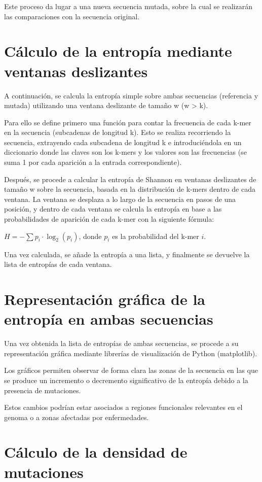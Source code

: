 \documentclass[11pt,spanish,listoffigures,listoftables]{tfgetsinf}
\begin{document}
Este proceso da lugar a una nueva secuencia mutada, sobre la cual se realizarán las comparaciones con la secuencia original. 

\section{Cálculo de la entropía mediante ventanas deslizantes}

A continuación, se calcula la entropía simple sobre ambas secuencias (referencia y mutada) utilizando una ventana deslizante de tamaño w (w > k). 

Para ello se define primero una función para contar la frecuencia de cada k-mer en la secuencia (subcadenas de longitud k). Esto se realiza recorriendo la secuencia, extrayendo cada subcadena de longitud k e introduciéndola en un diccionario donde las claves son los k-mers y los valores son las frecuencias (se suma 1 por cada aparición a la entrada correspondiente).  

Después, se procede a calcular la entropía de Shannon en ventanas deslizantes de tamaño w sobre la secuencia, basada en la distribución de k-mers dentro de cada ventana. La ventana se desplaza a lo largo de la secuencia en pasos de una posición, y dentro de cada ventana se calcula la entropía en base a las probabilidades de aparición de cada k-mer con la siguiente fórmula: 

$H = -\sum p_i \cdot \log_2(p_i)$, donde $p_i$ es la probabilidad del k-mer $i$.

Una vez calculada, se añade la entropía a una lista, y finalmente se devuelve la lista de entropías de cada ventana. 

\section{Representación gráfica de la entropía en ambas secuencias}

Una vez obtenida la lista de entropías de ambas secuencias, se procede a su representación gráfica mediante librerías de visualización de Python (matplotlib). 

Los gráficos permiten observar de forma clara las zonas de la secuencia en las que se produce un incremento o decremento significativo de la entropía debido a la presencia de mutaciones. 

Estos cambios podrían estar asociados a regiones funcionales relevantes en el genoma o a zonas afectadas por enfermedades. 

\section{Cálculo de la densidad de mutaciones}
\end{document}
